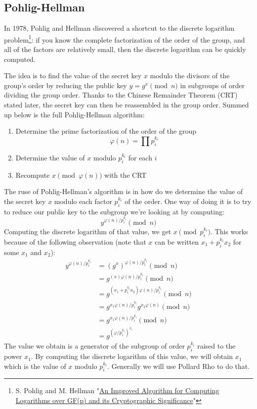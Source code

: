 \documentclass[a4paper,11pt,twocolumn]{article}
\begin{document}
\subsection{Pohlig-Hellman}

In 1978, Pohlig and Hellman discovered a shortcut to the discrete logarithm problem\footnote{S. Pohlig and M. Hellman "\href{http://www-ee.stanford.edu/~hellman/publications/28.pdf}{An Improved Algorithm for Computing Logarithms over GF(p) and its Cryptographic Significance}"}\cite{PH}: if you know the complete factorization of the order of the group, and all of the factors are relatively small, then the discrete logarithm can be quickly computed.

The idea is to find the value of the secret key $x$ modulo the divisors of the group's order by reducing the public key $y = g^x \pmod{n}$ in subgroups of order dividing the group order. Thanks to the Chinese Remainder Theorem (CRT) stated later, the secret key can then be reassembled in the group order. Summed up below is the full Pohlig-Hellman algorithm:

\begin{enumerate}
    \item Determine the prime factorization of the order of the group
        $$\varphi(n) = \prod p_i^{k_i} $$
    \item Determine the value of $x$ modulo $p_i^{k_i}$ for each $i$
    \item Recompute $x \pmod{\varphi(n)}$ with the CRT
\end{enumerate}

The ruse of Pohlig-Hellman's algorithm is in how do we determine the value of the secret key $x$ modulo each factor $p_i^{k_i}$ of the order. One way of doing it is to try to reduce our public key to the subgroup we're looking at by computing:
$$y^{\varphi(n)/p_i^{k_i}} \pmod{n}$$
Computing the discrete logarithm of that value, we get $x \pmod{p_i^{k_i}}$. This works because of the following observation (note that $x$ can be written $x_1 + p_i^{k_i} x_2$ for some $x_1$ and $x_2$):
\begin{align*}
    y^{\varphi(n)/p_i^{k_i}} &= (g^{x})^{\varphi(n)/p_i^{k_i}} \pmod{n}\\
    &= g^{(x) \varphi(n)/p_i^{k_i}} \pmod{n}\\
    &= g^{(x_1 + p_i^{k_i} x_2) \varphi(n)/p_i^{k_i}} \pmod{n}\\
    &= g^{x_1 \varphi(n)/p_i^{k_i}} g^{x_2 \varphi(n)} \pmod{n}\\
    &= g^{x_1 \varphi(n)/p_i^{k_i}} \pmod{n}\\
    &= g^{(\varphi/p_i^{k_i})^{x_1}}
\end{align*}
The value we obtain is a generator of the subgroup of order $p_i^{k_i}$ raised to the power $x_1$. By computing the discrete logarithm of this value, we will obtain $x_1$ which is the value of $x$ modulo $p_i^{k_i}$. Generally we will use Pollard Rho to do that.\\
\end{document}
